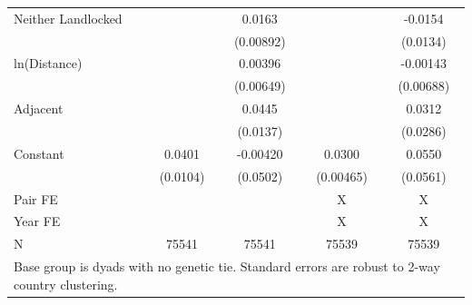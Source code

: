 \documentclass{article}
\begin{document}
\begin{table}[htbp]
\begin{tabular}{l*{4}{c}}
\addlinespace
Neither Landlocked  &            &      0.0163&            &     -0.0154\\
                    &            &   (0.00892)&            &    (0.0134)\\
\addlinespace
ln(Distance)        &            &     0.00396&            &    -0.00143\\
                    &            &   (0.00649)&            &   (0.00688)\\
\addlinespace
Adjacent            &            &      0.0445&            &      0.0312\\
                    &            &    (0.0137)&            &    (0.0286)\\
\addlinespace
Constant            &      0.0401&    -0.00420&      0.0300&      0.0550\\
                    &    (0.0104)&    (0.0502)&   (0.00465)&    (0.0561)\\
\midrule
Pair FE             &            &            &           X&           X\\
Year FE             &            &            &           X&           X\\
N                   &       75541&       75541&       75539&       75539\\
\bottomrule
\multicolumn{5}{l}{\footnotesize Base group is dyads with no genetic tie. Standard errors are robust to 2-way country clustering.}\\
\end{tabular}
\end{table}
\end{document}
